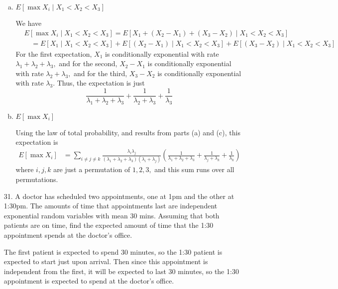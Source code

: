 \documentclass{article}
\begin{document}
\begin{itemize}
\begin{enumerate}[(a)]
			\item $E[\max X_i\mid X_1<X_2<X_3]$
				\begin{soln}
					We have
					\begin{align*}
						&E[\max X_i\mid X_1<X_2<X_3] = E[X_1+(X_2-X_1)+(X_3-X_2)\mid X_1<X_2<X_3] \\
						&\quad= E[X_1\mid X_1<X_2<X_3] + E[(X_2-X_1)\mid X_1<X_2<X_3] + E[(X_3-X_2)\mid X_1<X_2<X_3]
					\end{align*}
					For the first expectation, $X_1$ is conditionally exponential with rate $\lambda_1+\lambda_2+\lambda_3,$ and for the second, $X_2-X_1$ is conditionally exponential with rate $\lambda_2+\lambda_3,$ and for the third, $X_3-X_2$ is conditionally exponential with rate $\lambda_3.$ Thus, the expectation is just
					\[\frac{1}{\lambda_1+\lambda_2+\lambda_3} + \frac{1}{\lambda_2+\lambda_3} + \frac{1}{\lambda_3}\]
				\end{soln}

			\item $E[\max X_i]$
				\begin{soln}
					Using the law of total probability, and results from parts (a) and (c), this expectation is
					\begin{align*}
						E[\max X_i] &= \sum_{i\neq j\neq k}^{}\frac{\lambda_i\lambda_j}{(\lambda_1+\lambda_2+\lambda_3)(\lambda_i+\lambda_j)}\left( \frac{1}{\lambda_1+\lambda_2+\lambda_3} + \frac{1}{\lambda_j+\lambda_k} + \frac{1}{\lambda_k} \right)
					\end{align*}
					where $i, j, k$ are just a permutation of $1, 2, 3,$ and this sum runs over all permutations.
				\end{soln}
				
		\end{enumerate}

	\item[31.] A doctor has scheduled two appointments, one at 1pm and the other at 1:30pm. The amounts of time that appointments last are independent exponential random variables with mean 30 mins. Assuming that both patients are on time, find the expected amount of time that the 1:30 appointment spends at the doctor's office.
		\begin{soln}
			The first patient is expected to spend 30 minutes, so the 1:30 patient is expected to start just upon arrival. Then since this appointment is independent from the first, it will be expected to last 30 minutes, so the 1:30 appointment is expected to spend  at the doctor's office.
		\end{soln}


\end{itemize}
\end{document}

